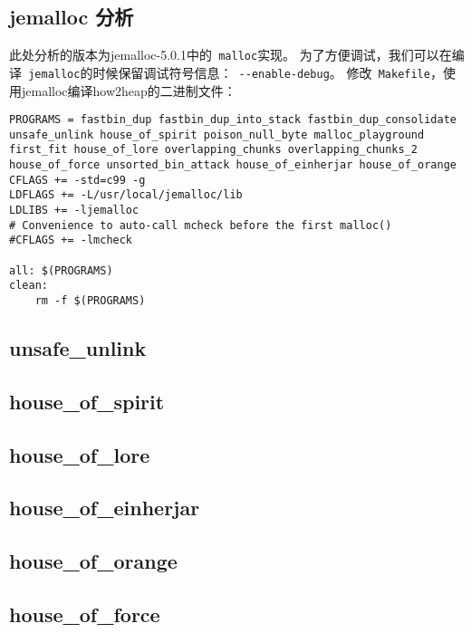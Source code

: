 \begin{center}
    \section{jemalloc 分析}
\end{center}

\setlength{\parindent}{2em}
此处分析的版本为jemalloc-5.0.1中的\verb+ malloc+实现。
为了方便调试，我们可以在编译\verb+ jemalloc+的时候保留调试符号信息：\verb+ --enable-debug+。
修改\verb+ Makefile+，使用jemalloc编译how2heap的二进制文件：
\begin{verbatim}
PROGRAMS = fastbin_dup fastbin_dup_into_stack fastbin_dup_consolidate unsafe_unlink house_of_spirit poison_null_byte malloc_playground first_fit house_of_lore overlapping_chunks overlapping_chunks_2 house_of_force unsorted_bin_attack house_of_einherjar house_of_orange
CFLAGS += -std=c99 -g
LDFLAGS += -L/usr/local/jemalloc/lib
LDLIBS += -ljemalloc
# Convenience to auto-call mcheck before the first malloc()
#CFLAGS += -lmcheck

all: $(PROGRAMS)
clean:
    rm -f $(PROGRAMS)
\end{verbatim}

\subsection{unsafe\_unlink}

\subsection{house\_of\_spirit}

\subsection{house\_of\_lore}

\subsection{house\_of\_einherjar}

\subsection{house\_of\_orange}

\subsection{house\_of\_force}

